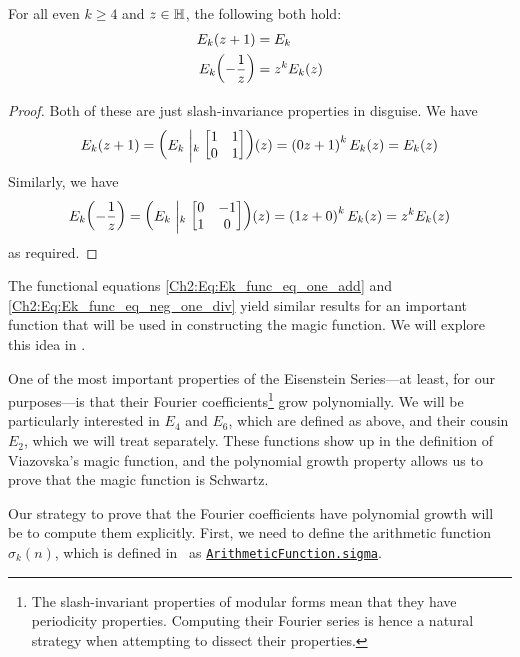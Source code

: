 \begin{boxproposition}\label{Ch2:Prop:Eisenstein_func_eq}
    For all even $k \geq 4$ and $z \in \mathbb{H}$, the following both hold:
    \begin{align}
        E_k\!\left( z + 1 \right) &= E_k \label{Ch2:Eq:Ek_func_eq_one_add} \\
        E_k\!\left( -\frac{1}{z} \right) &= z^k E_k(z) \label{Ch2:Eq:Ek_func_eq_neg_one_div}
    \end{align}
\end{boxproposition}
\begin{proof}
    Both of these are just slash-invariance properties in disguise. We have
    \begin{align*}
        E_k(z + 1) = \left( E_k \; \middle\vert_k \; {\begin{bmatrix} 1 & 1 \\ 0 & 1 \end{bmatrix}} \right)\!\left( z \right) = \left( 0z + 1 \right)^{k} E_k(z) = E_k(z)
    \end{align*}
    Similarly, we have
    \begin{align*}
        E_k\!\left( -\frac{1}{z} \right) = \left( E_k \; \middle\vert_k \; {\begin{bmatrix} 0 & -1 \\ 1 & 0 \end{bmatrix}} \right)\!\left( z \right) = \left( 1z + 0 \right)^k E_k(z) = z^k E_k(z)
    \end{align*}
    as required.
\end{proof}

The functional equations \eqref{Ch2:Eq:Ek_func_eq_one_add} and \eqref{Ch2:Eq:Ek_func_eq_neg_one_div} yield similar results for an important function that will be used in constructing the magic function. We will explore this idea in .

One of the most important properties of the Eisenstein Series---at least, for our purposes---is that their Fourier coefficients\footnote{The slash-invariant properties of modular forms mean that they have periodicity properties. Computing their Fourier series is hence a natural strategy when attempting to dissect their properties.} grow polynomially. We will be particularly interested in $E_4$ and $E_6$, which are defined as above, and their cousin $E_2$, which we will treat separately. These functions show up in the definition of Viazovska's magic function, and the polynomial growth property allows us to prove that the magic function is Schwartz.

Our strategy to prove that the Fourier coefficients have polynomial growth will be to compute them explicitly. First, we need to define the arithmetic function $\sigma_k(n)$, which is defined in \mathlib\ as \href{https://github.com/leanprover-community/mathlib4/blob/70816aec3a0f7bb98ac42991652a66b6405e1a00/Mathlib/NumberTheory/ArithmeticFunction.lean#L797-L799}{\texttt{ArithmeticFunction.sigma}}.

